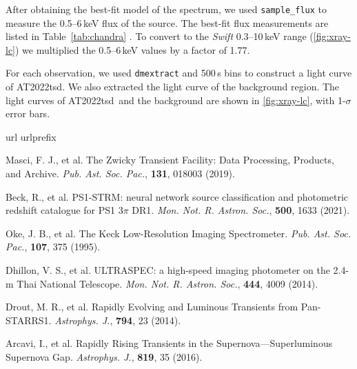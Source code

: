 \documentclass{nature_plusfigure}
\newcommand{\mn}{{Mon. Not. R. Astron. Soc.}}
\newcommand{\mnras}{\mn}
\newcommand{\apj}{{Astrophys. J.}}
\newcommand{\pasp}{{Pub. Ast. Soc. Pac.}}
\newcommand{\at}{AT2022tsd}
\begin{document}
\begin{methods}
After obtaining the best-fit model of the spectrum, we used \texttt{sample\_flux} to measure the 0.5--6\,keV flux of the source. The best-fit flux measurements are listed in Table~\ref{tab:chandra} . To convert to the \emph{Swift} 0.3--10\,keV range (\ref{fig:xray-lc}) we multiplied the 0.5--6\,keV values by a factor of 1.77.

For each observation, we used \texttt{dmextract} and 500\,s bins to construct a light curve of \at. We also extracted the light curve of the background region. The light curves of \at\ and the background are shown in \ref{fig:xray-lc}, with 1-$\sigma$ error bars.

\vspace{1in}
%
%

\begin{thebibliography}{10}
\expandafter\ifx\csname url\endcsname\relax
  \def\url#1{\texttt{#1}}\fi
\expandafter\ifx\csname urlprefix\endcsname\relax\def\urlprefix{URL }\fi
\providecommand{\bibinfo}[2]{#2}
\providecommand{\eprint}[2][]{\url{#2}}
\makeatletter
\addtocounter{\@listctr}{74}
\makeatother


 Masci, F. J., et al. The Zwicky Transient Facility: Data Processing, Products, and Archive. \emph{\pasp}, \textbf{131}, 018003 (2019). 

 Beck, R., et al. PS1-STRM: neural network source classification and photometric redshift catalogue for PS1 3$\pi$ DR1. \emph{\mnras}, \textbf{500}, 1633 (2021). 

 Oke, J. B., et al. The Keck Low-Resolution Imaging Spectrometer. \emph{\pasp}, \textbf{107}, 375 (1995). 

 Dhillon, V. S., et al. ULTRASPEC: a high-speed imaging photometer on the 2.4-m Thai National Telescope. \emph{\mnras}, \textbf{444}, 4009 (2014). 


 Drout, M. R., et al. Rapidly Evolving and Luminous Transients from Pan-STARRS1. \emph{\apj}, \textbf{794}, 23 (2014). 

 Arcavi, I., et al. Rapidly Rising Transients in the Supernova—Superluminous Supernova Gap. \emph{\apj}, \textbf{819}, 35 (2016). 


\end{thebibliography}
\end{methods}
\end{document}
